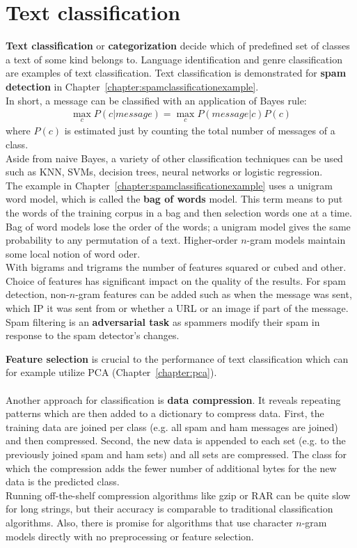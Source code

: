 \documentclass{report}
\begin{document}
\section{Text classification}
\label{chapter:textclassification}
{\bf Text classification} or {\bf categorization} decide which of predefined set of classes a text of some kind belongs to. Language identification and genre classification are examples of text classification.
Text classification is demonstrated for {\bf spam detection} in Chapter~\ref{chapter:spamclassificationexample}.
\\
In short, a message can be classified with an application of Bayes rule:
\begin{align*}
\max\limits_{c} P(c\vert message) = \max\limits_{c} P(message\vert c)P(c)
\end{align*}
where $P(c)$ is estimated just by counting the total number of messages of a class.
\\
Aside from naive Bayes, a variety of other classification techniques can be used such as KNN, SVMs, decision trees, neural networks or logistic regression.
\\
The example in Chapter~\ref{chapter:spamclassificationexample} uses a unigram word model, which is called the {\bf bag of words} model.
This term means to put the words of the training corpus in a bag and then selection words one at a time.
Bag of word models lose the order of the words; a unigram model gives the same probability to any permutation of a text.
Higher-order $n$-gram models maintain some local notion of word oder.
\\
With bigrams and trigrams the number of features squared or cubed and other.
Choice of features has significant impact on the quality of the results.
For spam detection, non-$n$-gram features can be added such as when the message was sent, which IP it was sent from or whether a URL or an image if part of the message.
Spam filtering is an {\bf adversarial task} as spammers modify their spam in response to the spam detector's changes.

{\bf Feature selection} is crucial to the performance of text classification which can for example utilize PCA (Chapter~\ref{chapter:pca}).
\\
\\
Another approach for classification is {\bf data compression}. It reveals repeating patterns which are then added to a dictionary to compress data.
First, the training data are joined per class (e.g. all spam and ham messages are joined) and then compressed. Second, the new data is appended to each set (e.g. to the previously joined spam and ham sets) and all sets are compressed.
The class for which the compression adds the fewer number of additional bytes for the new data is the predicted class.
\\
Running off-the-shelf compression algorithms like gzip or RAR can be quite slow for long strings, but their accuracy is comparable to traditional classification algorithms.
Also, there is promise for algorithms that use character $n$-gram models directly with no preprocessing or feature selection.
\end{document}
